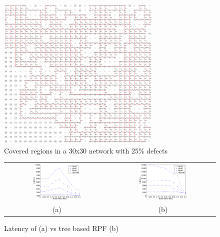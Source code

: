 \begin{figure}
\centering
\includegraphics[width=0.70\textwidth]{pictures/net.ps}
\caption{Covered regions in a 30x30 network with 25\% defects}
\label{fig:net}
\end{figure}

\begin{figure}
\centering
\begin{tabular}{cc}
\includegraphics[width=0.48\textwidth]{pictures/set2.eps} & 
\includegraphics[width=0.48\textwidth]{pictures/set2_rpf.eps} \\
(a) & (b)
\end{tabular}
\caption{Latency of \disr{} (a) vs tree based RPF (b) }
\label{fig:results_latency}
\end{figure}

